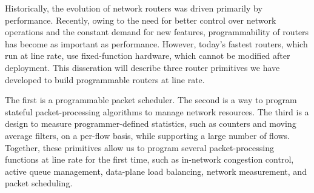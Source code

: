 % 
% 
%

Historically, the evolution of network routers was driven primarily by
performance. Recently, owing to the need for better control over network
operations and the constant demand for new features, programmability of routers
has become as important as performance.  However, today's fastest routers,
which run at line rate, use fixed-function hardware, which cannot be modified
after deployment. This disseration will describe three router primitives we
have developed to build programmable routers at line rate.

The first is a programmable packet scheduler. The second is a way to program
stateful packet-processing algorithms to manage network resources. The third is
a design to measure programmer-defined statistics, such as counters and moving
average filters, on a per-flow basis, while supporting a large number of flows.
Together, these primitives allow us to program several packet-processing
functions at line rate for the first time, such as in-network congestion
control, active queue management, data-plane load balancing, network
measurement, and packet scheduling.
